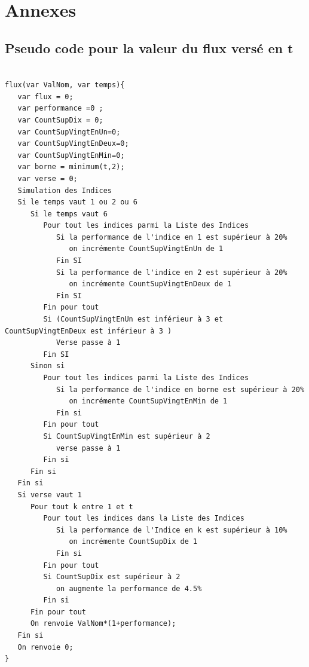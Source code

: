 \documentclass[french,12pt,a4paper]{article}
\begin{document}
\section{Annexes}

\subsection{Pseudo code pour la valeur du flux versé en t}

\begin{verbatim}

flux(var ValNom, var temps){
   var flux = 0;
   var performance =0 ;
   var CountSupDix = 0;
   var CountSupVingtEnUn=0;
   var CountSupVingtEnDeux=0;
   var CountSupVingtEnMin=0;
   var borne = minimum(t,2);
   var verse = 0;
   Simulation des Indices
   Si le temps vaut 1 ou 2 ou 6
      Si le temps vaut 6
         Pour tout les indices parmi la Liste des Indices
            Si la performance de l'indice en 1 est supérieur à 20%
               on incrémente CountSupVingtEnUn de 1
            Fin SI
            Si la performance de l'indice en 2 est supérieur à 20%
               on incrémente CountSupVingtEnDeux de 1
            Fin SI
         Fin pour tout
         Si (CountSupVingtEnUn est inférieur à 3 et CountSupVingtEnDeux est inférieur à 3 )
            Verse passe à 1
         Fin SI
      Sinon si
         Pour tout les indices parmi la Liste des Indices
            Si la performance de l'indice en borne est supérieur à 20%
               on incrémente CountSupVingtEnMin de 1 
            Fin si
         Fin pour tout
         Si CountSupVingtEnMin est supérieur à 2
            verse passe à 1
         Fin si
      Fin si
   Fin si
   Si verse vaut 1
      Pour tout k entre 1 et t
         Pour tout les indices dans la Liste des Indices
            Si la performance de l'Indice en k est supérieur à 10%
               on incrémente CountSupDix de 1
            Fin si
         Fin pour tout
         Si CountSupDix est supérieur à 2
            on augmente la performance de 4.5%
         Fin si
      Fin pour tout
      On renvoie ValNom*(1+performance);
   Fin si
   On renvoie 0;
}
\end{verbatim}
\end{document}
